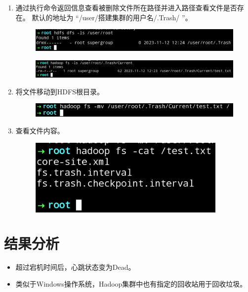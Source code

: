 \documentclass {article}
\begin{document}
\begin{enumerate}
					\item 通过执行命令返回信息查看被删除文件所在路径并进入路径查看文件是否存在。
					默认的地址为 “/user/搭建集群的用户名/.Trash/ ”。
					\begin{figure}[H]
						\centering
						\includegraphics[width=4.5in]{figures/fig18.png}
					\end{figure}
					\begin{figure}[H]
						\centering
						\includegraphics[width=4.5in]{figures/fig19.png}
					\end{figure}
					
					\item 将文件移动到HDFS根目录。
					\begin{figure}[H]
						\centering
						\includegraphics[width=4.5in]{figures/fig20.png}
					\end{figure}
				
					\item 查看文件内容。
					\begin{figure}[H]
						\centering
						\includegraphics{figures/fig21.png}
					\end{figure}
				\end{enumerate}
			
	\section{结果分析}
		\begin{itemize}
			\item 超过宕机时间后，心跳状态变为Dead。
			\item 类似于Windows操作系统，Hadoop集群中也有指定的回收站用于回收垃圾。
		\end{itemize}
	
\end{document}
